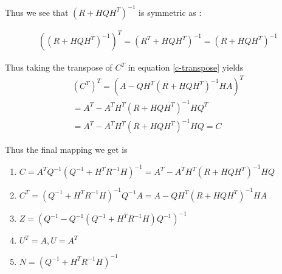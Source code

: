 \documentclass{tufte-handout}
\begin{document}
Thus we see that $(R + HQH^T)^{-1}$ is symmetric as : 

\begin{multline}
   ((R + HQH^T)^{-1} )^T =  (R^T + HQH^T)^{-1} = (R + HQH^T)^{-1}
\end{multline}

Thus taking  the transpose of  $C^T$ in equation \ref{c-transpose} yields 
\begin{multline}
   (C^T)^T = (A - QH^T (R + HQH^T)^{-1} H A)^T  \\
   = A^T - A^T H^T ( R +   HQH^T)^{-1} H Q^T \\ 
   =A^T - A^T H^T ( R +   HQH^T)^{-1} H Q  = C
\end{multline}

Thus the final mapping we get is 

\begin{enumerate}
    \item  $C = A^TQ^{-1}(Q^{-1} + H^T R^{-1}H)^{-1} = A^T - A^T H^T ( R +   HQH^T)^{-1} H Q  $
    \item  $C^T = (Q^{-1} + H^T R^{-1}H)^{-1}Q^{-1}A = A - QH^T (R + HQH^T)^{-1} H A$
    \item $Z  = (Q^{-1} - Q^{-1}(Q^{-1}  + H^TR^{-1}H) Q^{-1})^{-1} $
    \item $U^T = A, U = A^T$
    \item $N  = (Q^{-1} + H^TR^{-1}H)^{-1}$
\end{enumerate}



\end{document}
